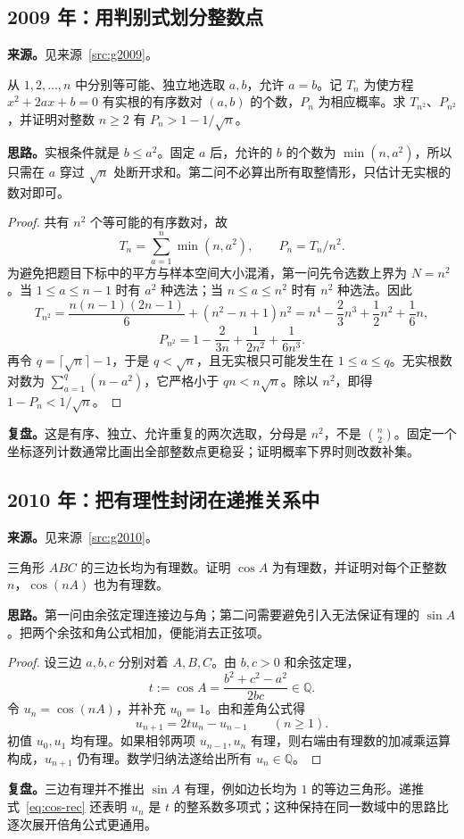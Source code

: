 \documentclass[UTF8]{ctexart}
\begin{document}
\subsection{2009 年：用判别式划分整数点}\label{sec:g2009}
\textbf{来源。}见来源~\ref{src:g2009}。
\begin{example}[题意重述]
从 $1,2,\ldots,n$ 中分别等可能、独立地选取 $a,b$，允许 $a=b$。记 $T_n$ 为使方程 $x^2+2ax+b=0$ 有实根的有序数对 $(a,b)$ 的个数，$P_n$ 为相应概率。求 $T_{n^2}$、$P_{n^2}$，并证明对整数 $n\geq2$ 有 $P_n>1-1/\sqrt n$。
\end{example}
\textbf{思路。}实根条件就是 $b\leq a^2$。固定 $a$ 后，允许的 $b$ 的个数为 $\min(n,a^2)$，所以只需在 $a$ 穿过 $\sqrt n$ 处断开求和。第二问不必算出所有取整情形，只估计无实根的数对即可。
\begin{proof}
共有 $n^2$ 个等可能的有序数对，故
\begin{equation}\label{eq:g2009-count}
T_n=\sum_{a=1}^{n}\min(n,a^2),\qquad P_n=T_n/n^2.
\end{equation}
为避免把题目下标中的平方与样本空间大小混淆，第一问先令选数上界为 $N=n^2$。当 $1\leq a\leq n-1$ 时有 $a^2$ 种选法；当 $n\leq a\leq n^2$ 时有 $n^2$ 种选法。因此
\[
T_{n^2}=\frac{n(n-1)(2n-1)}6+(n^2-n+1)n^2
=n^4-\frac23n^3+\frac12n^2+\frac16n,
\]
\[
P_{n^2}=1-\frac{2}{3n}+\frac{1}{2n^2}+\frac{1}{6n^3}.
\]
再令 $q=\lceil\sqrt n\rceil-1$，于是 $q<\sqrt n$，且无实根只可能发生在 $1\leq a\leq q$。无实根数对数为 $\sum_{a=1}^{q}(n-a^2)$，它严格小于 $qn<n\sqrt n$。除以 $n^2$，即得 $1-P_n<1/\sqrt n$。
\end{proof}
\textbf{复盘。}这是有序、独立、允许重复的两次选取，分母是 $n^2$，不是 $\binom n2$。固定一个坐标逐列计数通常比画出全部整数点更稳妥；证明概率下界时则改数补集。

\subsection{2010 年：把有理性封闭在递推关系中}\label{sec:g2010}
\textbf{来源。}见来源~\ref{src:g2010}。
\begin{example}[题意重述]
三角形 $ABC$ 的三边长均为有理数。证明 $\cos A$ 为有理数，并证明对每个正整数 $n$，$\cos(nA)$ 也为有理数。
\end{example}
\textbf{思路。}第一问由余弦定理连接边与角；第二问需要避免引入无法保证有理的 $\sin A$。把两个余弦和角公式相加，便能消去正弦项。
\begin{proof}
设三边 $a,b,c$ 分别对着 $A,B,C$。由 $b,c>0$ 和余弦定理，
\[
t:=\cos A=\frac{b^2+c^2-a^2}{2bc}\in\mathbb Q.
\]
令 $u_n=\cos(nA)$，并补充 $u_0=1$。由和差角公式得
\begin{equation}\label{eq:cos-rec}
u_{n+1}=2tu_n-u_{n-1}\qquad(n\geq1).
\end{equation}
初值 $u_0,u_1$ 均有理。如果相邻两项 $u_{n-1},u_n$ 有理，则右端由有理数的加减乘运算构成，$u_{n+1}$ 仍有理。数学归纳法遂给出所有 $u_n\in\mathbb Q$。
\end{proof}
\textbf{复盘。}三边有理并不推出 $\sin A$ 有理，例如边长均为 $1$ 的等边三角形。递推式~\eqref{eq:cos-rec} 还表明 $u_n$ 是 $t$ 的整系数多项式；这种保持在同一数域中的思路比逐次展开倍角公式更通用。
\end{document}
